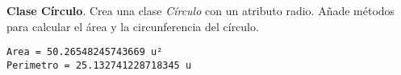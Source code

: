 \begin{exercise}{\rm \textbf{Clase Círculo}. 
Crea una clase \emph{Círculo} con un atributo radio. Añade métodos para
calcular el área y la circunferencia del círculo.

\begin{Shaded}
\begin{Highlighting}[]

     \NormalTok{(}
        \OperatorTok{=}

    \NormalTok{):}
        \OperatorTok{*} \OperatorTok{**}

    \NormalTok{):}
         \OperatorTok{*}\OperatorTok{*}
    
\OperatorTok{=}\NormalTok{)}
\NormalTok{(}\SpecialCharTok{\{}\SpecialCharTok{\}}\NormalTok{)}
\NormalTok{(}\SpecialCharTok{\{}\SpecialCharTok{\}}\NormalTok{)}
\end{Highlighting}
\end{Shaded}

\begin{verbatim}
Area = 50.26548245743669 u²
Perimetro = 25.132741228718345 u
\end{verbatim}
}\end{exercise}

